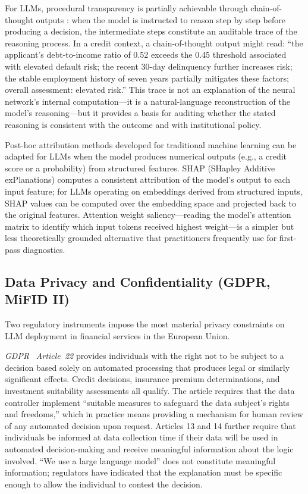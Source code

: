\begin{context}
For LLMs, procedural transparency is partially achievable through chain-of-thought outputs \cite{wei2022chain}: when the model is instructed to reason step by step before producing a decision, the intermediate steps constitute an auditable trace of the reasoning process. In a credit context, a chain-of-thought output might read: ``the applicant's debt-to-income ratio of 0.52 exceeds the 0.45 threshold associated with elevated default risk; the recent 30-day delinquency further increases risk; the stable employment history of seven years partially mitigates these factors; overall assessment: elevated risk.'' This trace is not an explanation of the neural network's internal computation---it is a natural-language reconstruction of the model's reasoning---but it provides a basis for auditing whether the stated reasoning is consistent with the outcome and with institutional policy.

Post-hoc attribution methods \cite{doshivelez2017rigorous} developed for traditional machine learning can be adapted for LLMs when the model produces numerical outputs (e.g., a credit score or a probability) from structured features. SHAP (SHapley Additive exPlanations) computes a consistent attribution of the model's output to each input feature; for LLMs operating on embeddings derived from structured inputs, SHAP values can be computed over the embedding space and projected back to the original features. Attention weight saliency---reading the model's attention matrix to identify which input tokens received highest weight---is a simpler but less theoretically grounded alternative that practitioners frequently use for first-pass diagnostics.

\subsection{Data Privacy and Confidentiality (GDPR, MiFID II)}
\label{subsec:af-deployment-privacy}

Two regulatory instruments impose the most material privacy constraints on LLM deployment in financial services in the European Union.

\emph{GDPR}~\citep{gdpr2016} \emph{Article~22} provides individuals with the right not to be subject to a decision based solely on automated processing that produces legal or similarly significant effects. Credit decisions, insurance premium determinations, and investment suitability assessments all qualify. The article requires that the data controller implement ``suitable measures to safeguard the data subject's rights and freedoms,'' which in practice means providing a mechanism for human review of any automated decision upon request. Articles 13 and 14 further require that individuals be informed at data collection time if their data will be used in automated decision-making and receive meaningful information about the logic involved. ``We use a large language model'' does not constitute meaningful information; regulators have indicated that the explanation must be specific enough to allow the individual to contest the decision.


\end{context}
